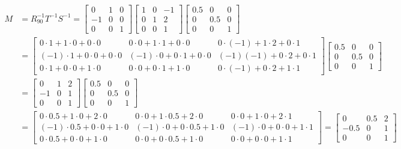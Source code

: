 \documentclass{article}
\begin{document}
\begin{align*}
	M & = R_{90}^{-1} T^{-1} S^{-1} = \begin{bmatrix} 0 & 1 & 0 \\ -1 & 0 & 0 \\ 0 & 0 & 1 \end{bmatrix} \begin{bmatrix} 1 & 0 & -1 \\ 0 & 1 & 2 \\ 0 & 0 & 1 \end{bmatrix} \begin{bmatrix} 0.5 & 0 & 0 \\ 0 & 0.5 & 0 \\ 0 & 0 & 1 \end{bmatrix} \\ 
	& = \begin{bmatrix}0\cdot 1+1\cdot 0+0\cdot 0&0\cdot 0+1\cdot 1+0\cdot 0&0\cdot \left(-1\right)+1\cdot 2+0\cdot 1\\ \left(-1\right)\cdot 1+0\cdot 0+0\cdot 0&\left(-1\right)\cdot 0+0\cdot 1+0\cdot 0&\left(-1\right)\left(-1\right)+0\cdot 2+0\cdot 1\\ 0\cdot 1+0\cdot 0+1\cdot 0&0\cdot 0+0\cdot 1+1\cdot 0&0\cdot \left(-1\right)+0\cdot 2+1\cdot 1\end{bmatrix} \begin{bmatrix} 0.5 & 0 & 0 \\ 0 & 0.5 & 0 \\ 0 & 0 & 1 \end{bmatrix} \\
	& = \begin{bmatrix}0&1&2\\ -1&0&1\\ 0&0&1\end{bmatrix} \begin{bmatrix} 0.5 & 0 & 0 \\ 0 & 0.5 & 0 \\ 0 & 0 & 1 \end{bmatrix} \\
	& = \begin{bmatrix}0\cdot 0.5+1\cdot 0+2\cdot 0&0\cdot 0+1\cdot 0.5+2\cdot 0&0\cdot 0+1\cdot 0+2\cdot 1\\ \left(-1\right)\cdot 0.5+0\cdot 0+1\cdot 0&\left(-1\right)\cdot 0+0\cdot 0.5+1\cdot 0&\left(-1\right)\cdot 0+0\cdot 0+1\cdot 1\\ 0\cdot 0.5+0\cdot 0+1\cdot 0&0\cdot 0+0\cdot 0.5+1\cdot 0&0\cdot 0+0\cdot 0+1\cdot 1\end{bmatrix} = \begin{bmatrix}0&0.5&2\\ -0.5&0&1\\ 0&0&1\end{bmatrix}
\end{align*}
\end{document}
